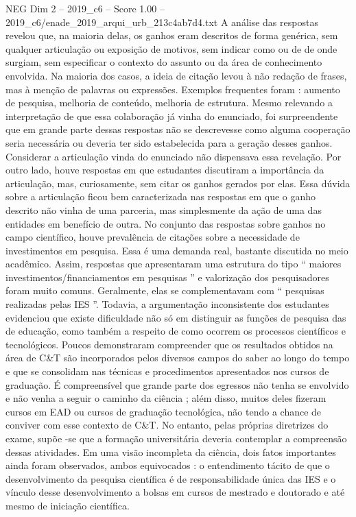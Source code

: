 \begin{textsample}{NEG Dim 2 – 2019\_c6 – Score 1.00 – 2019\_c6/enade\_2019\_arqui\_urb\_213c4ab7d4.txt}
A análise das respostas revelou que, na maioria delas, os ganhos eram descritos de forma genérica, sem qualquer articulação ou exposição de motivos, sem indicar como ou de de onde surgiam, sem especificar o contexto do assunto ou da área de conhecimento envolvida.
Na maioria dos casos, a ideia de citação levou à não redação de frases, mas à menção de palavras ou expressões.
Exemplos frequentes foram : aumento de pesquisa, melhoria de conteúdo, melhoria de estrutura.
Mesmo relevando a interpretação de que essa colaboração já vinha do enunciado, foi surpreendente que em grande parte dessas respostas não se descrevesse como alguma cooperação seria necessária ou deveria ter sido estabelecida para a geração desses ganhos.
Considerar a articulação vinda do enunciado não dispensava essa revelação.
Por outro lado, houve respostas em que estudantes discutiram a importância da articulação, mas, curiosamente, sem citar os ganhos gerados por elas.
Essa dúvida sobre a articulação ficou bem caracterizada nas respostas em que o ganho descrito não vinha de uma parceria, mas simplesmente da ação de uma das entidades em benefício de outra.
No conjunto das respostas sobre ganhos no campo científico, houve prevalência de citações sobre a necessidade de investimentos em pesquisa.
Essa é uma demanda real, bastante discutida no meio acadêmico.
Assim, respostas que apresentaram uma estrutura do tipo “ maiores investimentos/financiamentos em pesquisas ” e valorização dos pesquisadores foram muito comuns.
Geralmente, elas se complementavam com “ pesquisas realizadas pelas IES ”.
Todavia, a argumentação inconsistente dos estudantes evidenciou que existe dificuldade não só em distinguir as funções de pesquisa das de educação, como também a respeito de como ocorrem os processos científicos e tecnológicos.
Poucos demonstraram compreender que os resultados obtidos na área de C\&T são incorporados pelos diversos campos do saber ao longo do tempo e que se consolidam nas técnicas e procedimentos apresentados nos cursos de graduação.
É compreensível que grande parte dos egressos não tenha se envolvido e não venha a seguir o caminho da ciência ; além disso, muitos deles fizeram cursos em EAD ou cursos de graduação tecnológica, não tendo a chance de conviver com esse contexto de C\&T.
No entanto, pelas próprias diretrizes do exame, supõe -se que a formação universitária deveria contemplar a compreensão dessas atividades.
Em uma visão incompleta da ciência, dois fatos importantes ainda foram observados, ambos equivocados : o entendimento tácito de que o desenvolvimento da pesquisa científica é de responsabilidade única das IES e o vínculo desse desenvolvimento a bolsas em cursos de mestrado e doutorado e até mesmo de iniciação científica.

\end{textsample}
